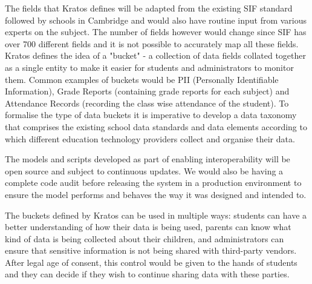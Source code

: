 \documentclass{article}
\begin{document}
\bigbreak
The fields that Kratos defines will be adapted from the existing SIF standard followed by schools in Cambridge and would also have routine input from various experts on the subject. The number of fields however would change since SIF has over 700 different fields and it is not possible to accurately map all these fields. Kratos defines the idea of a "bucket" - a collection of data fields collated together as a single entity to make it easier for students and administrators to monitor them. Common examples of buckets would be PII (Personally Identifiable Information), Grade Reports (containing grade reports for each subject) and Attendance Records (recording the class wise attendance of the student). To formalise the type of data buckets it is imperative to develop a data taxonomy that comprises the existing school data standards and data elements according to which different education technology providers collect and organise their data. 

\bigbreak
The models and scripts developed as part of enabling interoperability will be open source and subject to continuous updates. We would also be having a complete code audit before releasing the system in a production environment to ensure the model performs and behaves the way it was designed and intended to.

\bigbreak
The buckets defined by Kratos can be used in multiple ways: students can have a better understanding of how their data is being used, parents can know what kind of data is being collected about their children, and administrators can ensure that sensitive information is not being shared with third-party vendors. After legal age of consent, this control would be given to the hands of students and they can decide if they wish to continue sharing data with these parties.
\end{document}
